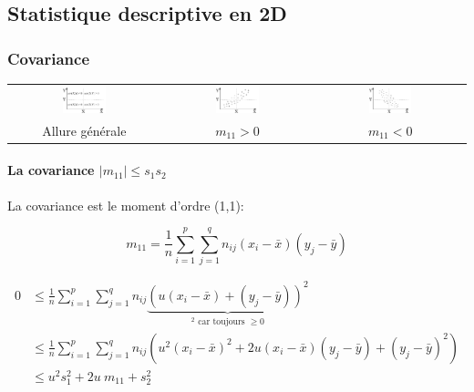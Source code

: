 \subsection{Statistique descriptive en 2D}


\subsubsection{Covariance}

\begin{center}
	\begin{tabular}{ccc}
		\includegraphics[width=0.3\textwidth]{images/covariance-all.pdf}&\includegraphics[width=0.3\textwidth]{images/covariance-positive.pdf}&\includegraphics[width=0.3\textwidth]{images/covariance-negative.pdf}\\
		Allure générale&$m_{11}>0$&$m_{11}<0$
	\end{tabular}
\end{center}





\paragraph{La covariance $|m_{11}| \leq s_1s_2$}

La covariance est le moment d'ordre (1,1):

$$m_{11}=\frac{1}{n} \sum_{i=1}^{p} \sum_{j=1}^{q} n_{ij} (x_i-\bar{x})(y_j-\bar{y})$$

\begin{align*}
	0 &\leq \frac{1}{n} \sum_{i=1}^{p} \sum_{j=1}^{q} n_{ij} \underbrace{ ( u (x_i-\bar{x})+(y_j-\bar{y}))^2 }_\text{$^2$ car toujours $\geq 0$} \\
	  &\leq \frac{1}{n} \sum_{i=1}^{p} \sum_{j=1}^{q} n_{ij} (u^2(x_i-\bar{x})^2 + 2u(x_i-\bar{x})(y_j-\bar{y})+(y_j-\bar{y})^2)\\
	  &\leq u^2s_1^2+2u\ m_{11}+s_2^2
\end{align*}

